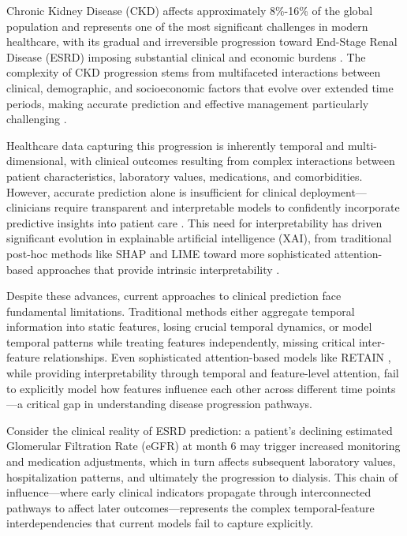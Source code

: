 \documentclass[letterpaper]{article}
\begin{document}
Chronic Kidney Disease (CKD) affects approximately 8\%-16\% of the global population and represents one of the most significant challenges in modern healthcare, with its gradual and irreversible progression toward End-Stage Renal Disease (ESRD) imposing substantial clinical and economic burdens \cite{NKF_CKD_2024, NCHS2019Mortality}. The complexity of CKD progression stems from multifaceted interactions between clinical, demographic, and socioeconomic factors that evolve over extended time periods, making accurate prediction and effective management particularly challenging \cite{lin2013progression}.

Healthcare data capturing this progression is inherently temporal and multi-dimensional, with clinical outcomes resulting from complex interactions between patient characteristics, laboratory values, medications, and comorbidities. However, accurate prediction alone is insufficient for clinical deployment—clinicians require transparent and interpretable models to confidently incorporate predictive insights into patient care \cite{caruana2015intelligible, rudin2019stop, tonekaboni2019clinicians}. This need for interpretability has driven significant evolution in explainable artificial intelligence (XAI), from traditional post-hoc methods like SHAP \cite{lundberg2017unified} and LIME \cite{ribeiro2016should} toward more sophisticated attention-based approaches that provide intrinsic interpretability \cite{choi2016retain, choi2017gram, bardhan2024icu}.

Despite these advances, current approaches to clinical prediction face fundamental limitations. Traditional methods either aggregate temporal information into static features, losing crucial temporal dynamics, or model temporal patterns while treating features independently, missing critical inter-feature relationships. Even sophisticated attention-based models like RETAIN \cite{choi2016retain}, while providing interpretability through temporal and feature-level attention, fail to explicitly model how features influence each other across different time points—a critical gap in understanding disease progression pathways.

Consider the clinical reality of ESRD prediction: a patient's declining estimated Glomerular Filtration Rate (eGFR) at month 6 may trigger increased monitoring and medication adjustments, which in turn affects subsequent laboratory values, hospitalization patterns, and ultimately the progression to dialysis. This chain of influence—where early clinical indicators propagate through interconnected pathways to affect later outcomes—represents the complex temporal-feature interdependencies that current models fail to capture explicitly.
\end{document}
